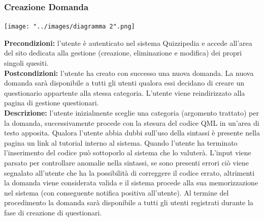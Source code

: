 \documentclass[a4paper,11pt]{article}
\begin{document}
\newpage
\subsubsection{Creazione Domanda}
\begin{center}
	\centerline{\texttt{[image: "../images/diagramma 2".png]}}
\end{center}
\textbf{Precondizioni:} l'utente è autenticato nel sistema Quizzipedia e accede all'area del sito dedicata alla gestione (creazione, eliminazione e modifica) dei propri singoli quesiti.\\
\textbf{Postcondizioni:} l'utente ha creato con successo una nuova domanda. La nuova domanda sarà disponibile a tutti gli utenti qualora essi decidano di creare un questionario appartente alla stessa categoria. L'utente viene reindirizzato alla pagina di gestione questionari.\\ %
\textbf{Descrizione:} l'utente inizialmente sceglie una categoria (argomento trattato) per la domanda, successivamente procede con la stesura del codice QML in un'area di testo apposita. Qualora l'utente abbia dubbi sull'uso della sintassi è presente nella pagina un link al tutorial interno al sistema. Quando l'utente ha terminato l'inserimento del codice può sottoporlo al sistema che lo valuterà. L'input viene parsato per controllare anomalie nella sintassi, se sono presenti errori ciò viene segnalato all'utente che ha la possibilità di correggere il codice errato, altrimenti la domanda viene considerata valida e il sistema procede alla sua memorizzazione nel sistema (con conseguente notifica positiva all'utente). Al termine del procedimento la domanda sarà disponibile a tutti gli utenti registrati durante la fase di creazione di questionari.\\
\newpage
\end{document}
